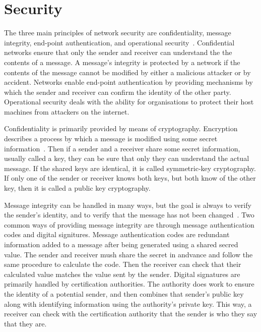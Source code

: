 \documentclass[12pt]{report}
\let\Oldsection\section
\renewcommand{\section}{\FloatBarrier\Oldsection}
\begin{document}

\section{Security} \label{security}

The three main principles of network security are confidentiality, message integrity, end-point authentication, and
operational security~\autocite{NETWORKTEXTBOOK}. Confidential networks ensure that only the sender and receiver can
understand the the contents of a message. A message's integrity is protected by a network if the contents of the message
cannot be modified by either a malicious attacker or by accident. Networks enable end-point authentication by providing
mechanisms by which the sender and receiver can confirm the identity of the other party. Operational security deals with
the ability for organisations to protect their host machines from attackers on the internet.

Confidentiality is primarily provided by means of cryptography. Encryption describes a process by which a message is
modified using some secret information~\autocite{NETWORKTEXTBOOK}. Then if a sender and a receiver share some secret
information, usually called a key, they can be sure that only they can understand the actual message. If the shared keys
are identical, it is called symmetric-key cryptography. If only one of the sender or receiver knows both keys, but both
know of the other key, then it is called a public key cryptography.

Message integrity can be handled in many ways, but the goal is always to verify the sender's identity, and to verify
that the message has not been changed~\autocite{NETWORKTEXTBOOK}. Two common ways of providing message integrity are
through message authentication codes and digital signitures. Message authentication codes are redundant information
added to a message after being generated using a shared secred value. The sender and receiver mush share the secret in
andvance and follow the same procedure to calculate the code. Then the receiver can check that their calculated value
matches the value sent by the sender. Digital signatures are primarily handled by certification authorities. The
authority does work to ensure the identity of a potential sender, and then combines that sender's public key along with
identifying information using the authority's private key. This way, a receiver can check with the certification
authority that the sender is who they say that they are.
\end{document}
